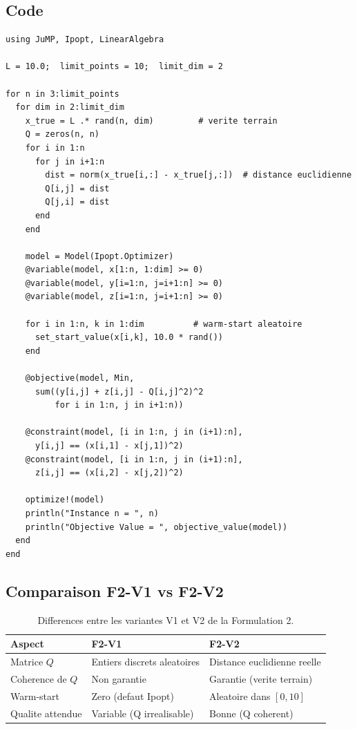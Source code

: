 \documentclass[12pt,a4paper]{article}
\begin{document}
\subsection{Code}

\begin{lstlisting}[caption={formulation\_2\_v2.jl}]
using JuMP, Ipopt, LinearAlgebra

L = 10.0;  limit_points = 10;  limit_dim = 2

for n in 3:limit_points
  for dim in 2:limit_dim
    x_true = L .* rand(n, dim)         # verite terrain
    Q = zeros(n, n)
    for i in 1:n
      for j in i+1:n
        dist = norm(x_true[i,:] - x_true[j,:])  # distance euclidienne
        Q[i,j] = dist
        Q[j,i] = dist
      end
    end

    model = Model(Ipopt.Optimizer)
    @variable(model, x[1:n, 1:dim] >= 0)
    @variable(model, y[i=1:n, j=i+1:n] >= 0)
    @variable(model, z[i=1:n, j=i+1:n] >= 0)

    for i in 1:n, k in 1:dim          # warm-start aleatoire
      set_start_value(x[i,k], 10.0 * rand())
    end

    @objective(model, Min,
      sum((y[i,j] + z[i,j] - Q[i,j]^2)^2
          for i in 1:n, j in i+1:n))

    @constraint(model, [i in 1:n, j in (i+1):n],
      y[i,j] == (x[i,1] - x[j,1])^2)
    @constraint(model, [i in 1:n, j in (i+1):n],
      z[i,j] == (x[i,2] - x[j,2])^2)

    optimize!(model)
    println("Instance n = ", n)
    println("Objective Value = ", objective_value(model))
  end
end
\end{lstlisting}

\subsection{Comparaison F2-V1 vs F2-V2}

\begin{table}[H]
\centering
\begin{tabularx}{\linewidth}{lXX}
\toprule
\textbf{Aspect} & \textbf{F2-V1} & \textbf{F2-V2} \\
\midrule
Matrice $Q$           & Entiers discrets aleatoires & Distance euclidienne reelle \\
Coherence de $Q$      & Non garantie & Garantie (verite terrain) \\
Warm-start            & Zero (defaut Ipopt) & Aleatoire dans $[0,10]$ \\
Qualite attendue      & Variable (Q irrealisable) & Bonne (Q coherent) \\
\bottomrule
\end{tabularx}
\caption{Differences entre les variantes V1 et V2 de la Formulation 2.}
\end{table}
\end{document}
